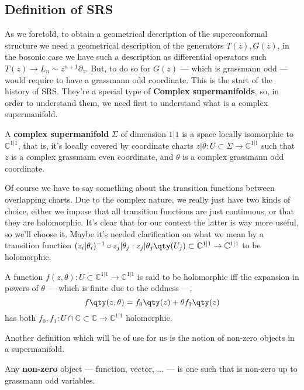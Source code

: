 \subsection{Definition of SRS}

As we foretold, to obtain a geometrical description of the superconformal structure we need a geometrical 
description of the generators $T(z),G(z)$, in the bosonic case we have such a description as differential 
operators such $T(z)\rightarrow L_n\sim z^{n+1}\partial_z$. But, to do so for $G(z)$ --- which is 
grassmann odd --- would require to have a grassmann odd coordinate. This is the start of the history of 
SRS. They're a special type of \textbf{Complex supermanifolds}, so, in order to understand them, 
we need first to understand what is a complex supermanifold.
\begin{definition}
    A \textbf{complex supermanifold} $\Sigma$ of dimension $1|1$ is a space locally isomorphic 
    to $\mathbb C^{1|1}$, that is, it's locally covered by coordinate charts $z|\theta:U\subset\Sigma\rightarrow\mathbb C^{1|1}$ 
    such that $z$ is a complex grassmann even coordinate, and $\theta$ is a complex grassmann odd coordinate.
\end{definition}
Of course we have to say something about the transition functions between overlapping charts. Due to the 
complex nature, we really just have two kinds of choice, either we impose that all transition 
functions are just continuous, or that they are holomorphic. It's clear that for our context 
the latter is way more useful, so we'll choose it. Maybe it's needed clarification on what we mean by 
a transition function $(z_i|\theta_i)^{-1}\circ z_j|\theta_j:z_j|\theta_j\qty(U_j)\subset\mathbb C^{1|1}\rightarrow \mathbb C^{1|1}$ 
to be holomorphic.
\begin{definition}
    A function $f(z,\theta):U\subset\mathbb C^{1|1}\rightarrow\mathbb C^{1|1}$ is said to be holomorphic iff 
    the expansion in powers of $\theta$ --- which is finite due to the oddness ---, $$f\qty(z,\theta)=f_0\qty(z)+\theta f_1\qty(z)$$ 
    has both $f_0,f_1: U\cap\mathbb C\subset\mathbb C\rightarrow\mathbb C^{1|1}$ holomorphic.
\end{definition}
Another definition which will be of use for us is the notion of non-zero objects in a supermanifold. 
\begin{definition}
    Any \textbf{non-zero} object --- function, vector, ... --- is one such that is non-zero up to grassmann odd 
    variables.
\end{definition}
